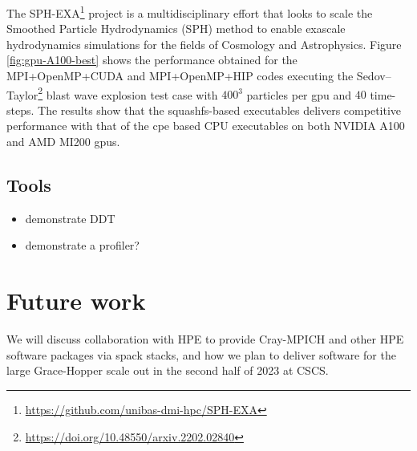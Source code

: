 The SPH-EXA\footnote{\url{https://github.com/unibas-dmi-hpc/SPH-EXA}} project is a multidisciplinary effort that looks to scale the Smoothed Particle Hydrodynamics (SPH) method to enable exascale hydrodynamics simulations for the fields of Cosmology and Astrophysics. 
Figure \ref{fig:gpu-A100-best} shows the performance obtained for the MPI+OpenMP+CUDA and MPI+OpenMP+HIP codes executing the Sedov--Taylor\footnote{\url{https://doi.org/10.48550/arxiv.2202.02840}} blast wave explosion test case with $400^3$ particles per gpu and $40$ time-steps.
The results show that the squashfs-based executables delivers competitive performance with that of the cpe based CPU executables on both NVIDIA A100 and AMD MI200 gpus.

\subsection{Tools}


\begin{itemize}
    \item demonstrate DDT
    \item demonstrate a profiler?
\end{itemize}

\section{Future work}

We will discuss collaboration with HPE to provide Cray-MPICH and other HPE software packages via spack stacks, and how we plan to deliver software for the large Grace-Hopper scale out in the second half of 2023 at CSCS.

